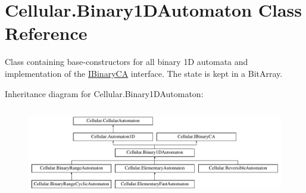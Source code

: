 \hypertarget{class_cellular_1_1_binary1_d_automaton}{}\section{Cellular.\+Binary1\+D\+Automaton Class Reference}
\label{class_cellular_1_1_binary1_d_automaton}


Class containing base-\/constructors for all binary 1\+D automata and implementation of the {\ttfamily \hyperlink{interface_cellular_1_1_i_binary_c_a}{I\+Binary\+C\+A}} interface. The state is kept in a {\ttfamily Bit\+Array}.  


Inheritance diagram for Cellular.\+Binary1\+D\+Automaton\+:\begin{figure}[H]
\begin{center}
\leavevmode
\includegraphics[height=3.954802cm]{class_cellular_1_1_binary1_d_automaton}
\end{center}
\end{figure}
